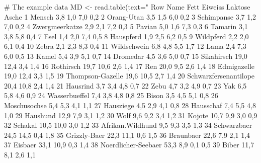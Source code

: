 \documentclass[letterpaper]{book}
\begin{document}
\begin{Examples}
\begin{ExampleCode}

# The example data
MD <- read.table(text="
Row  Name              Fett   Eiweiss Laktose Asche
  1  Mensch                  3,8      1,0       7,0      0,2
  2  Orang-Utan              3,5      1,5       6,0      0,2
  3  Schimpanse              3,7      1,2       7,0      0,2
  4  Zwergmeerkatze          2,9      2,1       7,2      0,3
  5  Pavian                  5,0      1,6       7,3      0,3
  6  Tamarin                 3,1      3,8       5,8      0,4
  7  Esel                    1,4      2,0       7,4      0,5
  8  Hauspferd               1,9      2,5       6,2      0,5
  9  Wildpferd               2,2      2,0       6,1      0,4
 10  Zebra                   2,1      2,3       8,3      0,4
 11  Wildschwein             6,8      4,8       5,5      1,7
 12  Lama                    2,4      7,3       6,0      0,5
 13  Kamel                   5,4      3,9       5,1      0,7
 14  Dromedar                4,5      3,6       5,0      0,7
 15  Sikahirsch             19,0     12,4       3,4      1,4
 16  Rothirsch              19,7     10,6       2,6      1,4
 17  Ren                    20,0      9,5       2,6      1,4
 18  Edmigazelle            19,0     12,4       3,3      1,5
 19  Thompson-Gazelle       19,6     10,5       2,7      1,4
 20  Schwarzfersenantilope  20,4     10,8       2,4      1,4
 21  Hausrind                3,7      3,4       4,8      0,7
 22  Zebu                    4,7      3,2       4,9      0,7
 23  Yak                     6,5      5,8       4,6      0,9
 24  Wasserbueffel            7,4      3,8       4,8      0,8
 25  Bison                   3,5      4,5       5,1      0,8
 26  Moschusochse            5,4      5,3       4,1      1,1
 27  Hausziege               4,5      2,9       4,1      0,8
 28  Hausschaf               7,4      5,5       4,8      1,0
 29  Haushund               12,9      7,9       3,1      1,2
 30  Wolf                    9,6      9,2       3,4      1,2
 31  Kojote                 10,7      9,9       3,0      0,9
 32  Schakal                10,5     10,0       3,0      1,2
 33  Afrikan.Wildhund        9,5      9,3       3,5      1,3
 34  Schwarzbaer             24,5     14,5       0,4      1,8
 35  Grizzly-Baer            22,3     11,1       0,6      1,5
 36  Braunbaer               22,6      7,9       2,1      1,4
 37  Eisbaer                 33,1     10,9       0,3      1,4
 38  Noerdlicher-Seebaer      53,3      8,9       0,1      0,5
 39  Biber                  11,7      8,1       2,6      1,1

\end{ExampleCode}
\end{Examples}
\end{document}
